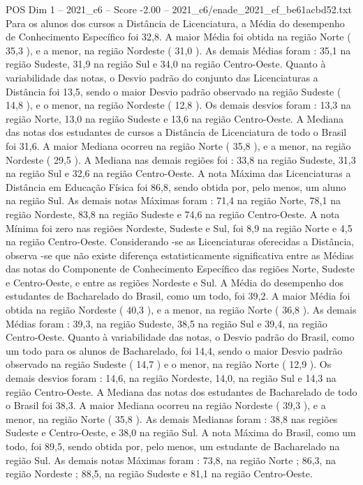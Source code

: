 \begin{textsample}{POS Dim 1 – 2021\_c6 – Score -2.00 – 2021\_c6/enade\_2021\_ef\_be61acbd52.txt}
Para os alunos dos cursos a Distância de Licenciatura, a Média do desempenho de Conhecimento Específico foi 32,8.
A maior Média foi obtida na região Norte ( 35,3 ), e a menor, na região Nordeste ( 31,0 ).
As demais Médias foram : 35,1 na região Sudeste, 31,9 na região Sul e 34,0 na região Centro-Oeste.
Quanto à variabilidade das notas, o Desvio padrão do conjunto das Licenciaturas a Distância foi 13,5, sendo o maior Desvio padrão observado na região Sudeste ( 14,8 ), e o menor, na região Nordeste ( 12,8 ).
Os demais desvios foram : 13,3 na região Norte, 13,0 na região Sudeste e 13,6 na região Centro-Oeste.
A Mediana das notas dos estudantes de cursos a Distância de Licenciatura de todo o Brasil foi 31,6.
A maior Mediana ocorreu na região Norte ( 35,8 ), e a menor, na região Nordeste ( 29,5 ).
A Mediana nas demais regiões foi : 33,8 na região Sudeste, 31,3 na região Sul e 32,6 na região Centro-Oeste.
A nota Máxima das Licenciaturas a Distância em Educação Física foi 86,8, sendo obtida por, pelo menos, um aluno na região Sul.
As demais notas Máximas foram : 71,4 na região Norte, 78,1 na região Nordeste, 83,8 na região Sudeste e 74,6 na região Centro-Oeste.
A nota Mínima foi zero nas regiões Nordeste, Sudeste e Sul, foi 8,9 na região Norte e 4,5 na região Centro-Oeste.
Considerando -se as Licenciaturas oferecidas a Distância, observa -se que não existe diferença estatisticamente significativa entre as Médias das notas do Componente de Conhecimento Específico das regiões Norte, Sudeste e Centro-Oeste, e entre as regiões Nordeste e Sul.
A Média do desempenho dos estudantes de Bacharelado do Brasil, como um todo, foi 39,2.
A maior Média foi obtida na região Nordeste ( 40,3 ), e a menor, na região Norte ( 36,8 ).
As demais Médias foram : 39,3, na região Sudeste, 38,5 na região Sul e 39,4, na região Centro-Oeste.
Quanto à variabilidade das notas, o Desvio padrão do Brasil, como um todo para os alunos de Bacharelado, foi 14,4, sendo o maior Desvio padrão observado na região Sudeste ( 14,7 ) e o menor, na região Norte ( 12,9 ).
Os demais desvios foram : 14,6, na região Nordeste, 14,0, na região Sul e 14,3 na região Centro-Oeste.
A Mediana das notas dos estudantes de Bacharelado de todo o Brasil foi 38,3.
A maior Mediana ocorreu na região Nordeste ( 39,3 ), e a menor, na região Norte ( 35,8 ).
As demais Medianas foram : 38,8 nas regiões Sudeste e Centro-Oeste, e 38,0 na região Sul.
A nota Máxima do Brasil, como um todo, foi 89,5, sendo obtida por, pelo menos, um estudante de Bacharelado na região Sul.
As demais notas Máximas foram : 73,8, na região Norte ; 86,3, na região Nordeste ; 88,5, na região Sudeste e 81,1 na região Centro-Oeste.

\end{textsample}

